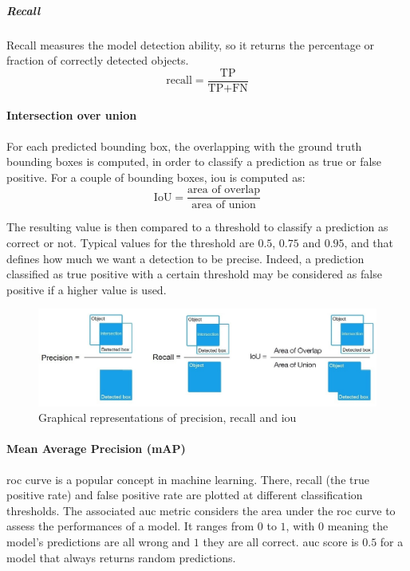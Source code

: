 \documentclass[%
    corpo=12pt,
    twoside,
    stile=classica,   
    tipotesi=magistrale,
    evenboxes,
    english,
	numerazioneromana,
]{toptesi}
\begin{document}
\subparagraph{Recall}
Recall measures the model detection ability, so it returns the percentage or fraction of correctly detected objects.
\begin{equation}
	\text{recall} = \frac{\text{TP}}{\text{TP}+\text{FN}}
\end{equation}

\paragraph{Intersection over union}
For each predicted bounding box, the overlapping with the ground truth bounding boxes is computed, in order to classify a prediction as true or false positive. For a couple of bounding boxes, \gls{iou} is computed as:
\begin{equation}
	\text{IoU} = \frac{\text{area of overlap}}{\text{area of union}}
\end{equation}

The resulting value is then compared to a threshold to classify a prediction as correct or not. Typical values for the threshold are $0.5$, $0.75$ and $0.95$, and that defines how much we want a detection to be precise. Indeed, a prediction classified as true positive with a certain threshold may be considered as false positive if a higher value is used.

\begin{figure}[t]
	\centering
	\includegraphics[width=\linewidth]{imgs/precision_recall_iou.jpg}
	\caption[Graphical representations of precision, recall and \gls{iou}]{Graphical representations of precision, recall and \gls{iou}}
	\label{fig:iou}
\end{figure}

\paragraph{Mean Average Precision (mAP)}
\gls{roc} curve is a popular concept in machine learning. There, recall (the true positive rate) and false positive rate are plotted at different classification thresholds. The associated \gls{auc} metric considers the area under the \gls{roc} curve to assess the performances of a model\cite{roc}. It ranges from $ 0 $ to $ 1 $, with $ 0 $ meaning the model's predictions are all wrong and $ 1 $ they are all correct. \Gls{auc} score is $ 0.5 $ for a model that always returns random predictions.
\end{document}
